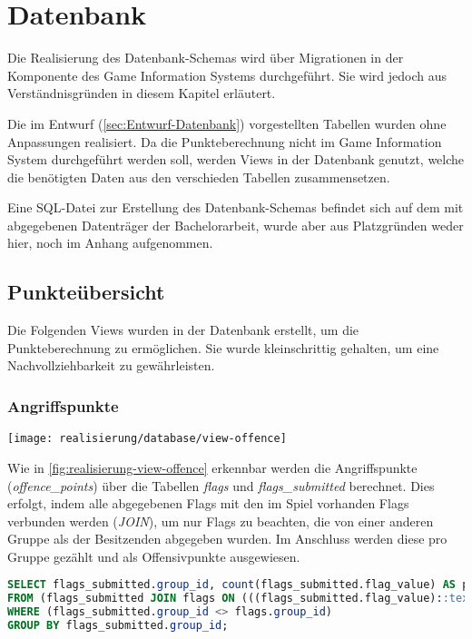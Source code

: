 \section{Datenbank}\label{sec:Realisierung-Datenbank}

Die Realisierung des Datenbank-Schemas wird über Migrationen in der Komponente des Game Information Systems durchgeführt. Sie wird jedoch aus Verständnisgründen in diesem Kapitel erläutert.

Die im Entwurf (\autoref{sec:Entwurf-Datenbank}) vorgestellten Tabellen wurden ohne Anpassungen realisiert. Da die Punkteberechnung nicht im Game Information System durchgeführt werden soll, werden Views in der Datenbank genutzt, welche die benötigten Daten aus den verschieden Tabellen zusammensetzen.

Eine SQL-Datei zur Erstellung des Datenbank-Schemas befindet sich auf dem mit abgegebenen Datenträger der Bachelorarbeit, wurde aber aus Platzgründen weder hier, noch im Anhang aufgenommen.

\subsection{Punkteübersicht}
Die Folgenden Views wurden in der Datenbank erstellt, um die Punkteberechnung zu ermöglichen. Sie wurde kleinschrittig gehalten, um eine Nachvollziehbarkeit zu gewährleisten.

\subsubsection{Angriffspunkte}\label{subsubsec:Angriffspunkte}
\begin{center}
	\texttt{[image: realisierung/database/view-offence]}
	\label{fig:realisierung-view-offence}
\end{center}

Wie in \autoref{fig:realisierung-view-offence} erkennbar werden die Angriffspunkte (\textit{offence\_points}) über die Tabellen \textit{flags} und \textit{flags\_submitted} berechnet. Dies erfolgt, indem alle abgegebenen Flags mit den im Spiel vorhanden Flags verbunden werden (\textit{JOIN}), um nur Flags zu beachten, die von einer anderen Gruppe als der Besitzenden abgegeben wurden. Im Anschluss werden diese pro Gruppe gezählt und als Offensivpunkte ausgewiesen.

\begin{lstlisting}[frame=single, language=sql, caption={SQL View Angriffspunkte}, captionpos=b, label={lst:database-offence-points}]
SELECT flags_submitted.group_id, count(flags_submitted.flag_value) AS points
FROM (flags_submitted JOIN flags ON (((flags_submitted.flag_value)::text = (flags.flag_value)::text)))
WHERE (flags_submitted.group_id <> flags.group_id)
GROUP BY flags_submitted.group_id;
\end{lstlisting}

